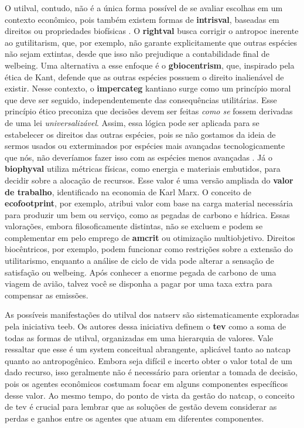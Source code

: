 \documentclass[./main.tex]{subfiles}
\begin{document}
\par O \gls{utilval}, contudo, não é a única forma possível de se avaliar escolhas em um contexto econômico, pois também existem formas de \textbf{\gls{intrisval}}, baseadas em direitos ou propriedades biofísicas \cite{kumar2012economics}. O \textbf{\gls{rightval}} busca corrigir o \gls{antropoc} inerente ao \gls{gutilitarism}, que, por exemplo, não garante explicitamente que outras espécies não sejam extintas, desde que isso não prejudique a contabilidade final de \gls{welbeing}. Uma alternativa a esse enfoque é o \textbf{\gls{gbiocentrism}}, que, inspirado pela ética de Kant, defende que as outras espécies possuem o direito inalienável de existir. Nesse contexto, o \textbf{\gls{impercateg}} kantiano surge como um princípio moral que deve ser seguido, independentemente das consequências utilitárias. Esse princípio ético preconiza que decisões devem ser feitas \textit{como se} fossem derivadas de uma lei \textit{universalizável}. Assim, essa lógica pode ser aplicada para se estabelecer os direitos das outras espécies, pois se não gostamos da ideia de sermos usados ou exterminados por espécies mais avançadas tecnologicamente que nós, não deveríamos fazer isso com as espécies menos avançadas \cite{daily1997}. Já o \textbf{\gls{biophyval}} utiliza métricas físicas, como energia e materiais embutidos, para decidir sobre a alocação de recursos. Esse valor é uma versão ampliada do \textbf{valor de trabalho}, identificado na economia de Karl Marx. O conceito de \textbf{\gls{ecofootprint}}, por exemplo, atribui valor com base na carga material necessária para produzir um bem ou serviço, como as pegadas de carbono e hídrica. Essas valorações, embora filosoficamente distintas, não se excluem e podem se complementar em pelo emprego de \textbf{\gls{amcrit}} ou otimização multiobjetivo. Direitos biocêntricos, por exemplo, podem funcionar como restrições sobre a extensão do utilitarismo, enquanto a análise de ciclo de vida pode alterar a sensação de satisfação ou \gls{welbeing}. Após conhecer a enorme pegada de carbono de uma viagem de avião, talvez você se disponha a pagar por uma taxa extra para compensar as emissões.

\par As possíveis manifestações do \gls{utilval} dos \gls{natserv} são sistematicamente exploradas pela iniciativa \acrfull{teeb}. Os autores dessa iniciativa definem o \textbf{\gls{tev}} como a soma de todas as formas de \gls{utilval}, organizadas em uma hierarquia de valores. Vale ressaltar que esse é um \gls{system} conceitual abrangente, aplicável tanto ao \gls{natcap} quanto ao antropogênico. Embora seja difícil e incerto obter o valor total de um dado recurso, isso geralmente não é necessário para orientar a tomada de decisão, pois os agentes econômicos costumam focar em alguns componentes específicos desse valor. Ao mesmo tempo, do ponto de vista da gestão do \gls{natcap}, o conceito de \gls{tev} é crucial para lembrar que as soluções de gestão devem considerar as perdas e ganhos entre os agentes que atuam em diferentes componentes.
\end{document}
